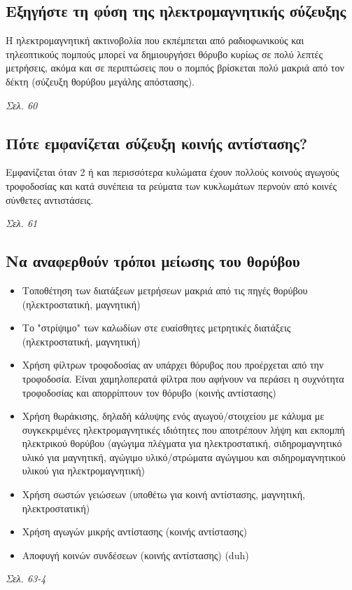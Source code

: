 \documentclass{article}
\begin{document}
\subsection{Εξηγήστε τη φύση της ηλεκτρομαγνητικής σύζευξης}
Η ηλεκτρομαγνητική ακτινοβολία που εκπέμπεται από ραδιοφωνικούς και τηλεοπτικούς πομπούς μπορεί να δημιουργήσει θόρυβο κυρίως σε πολύ λεπτές μετρήσεις, ακόμα και σε περιπτώσεις που ο πομπός βρίσκεται πολύ μακριά από τον δέκτη (σύζευξη θορύβου μεγάλης απόστασης).

\emph{Σελ. 60}

\subsection{Πότε εμφανίζεται σύζευξη κοινής αντίστασης?}
Εμφανίζεται όταν 2 ή και περισσότερα κυλώματα έχουν πολλούς κοινούς αγωγούς τροφοδοσίας και κατά συνέπεια τα ρεύματα των κυκλωμάτων περνούν από κοινές σύνθετες αντιστάσεις.

\emph{Σελ. 61}

\subsection{Να αναφερθούν τρόποι μείωσης του θορύβου}
\begin{itemize}
    \item Τοποθέτηση των διατάξεων μετρήσεων μακριά από τις πηγές θορύβου (ηλεκτροστατική, μαγνητική)
    \item Το "στρίψιμο" των καλωδίων στε ευαίσθητες μετρητικές διατάξεις (ηλεκτροστατική, μαγνητική)
    \item Χρήση φίλτρων τροφοδοσίας αν υπάρχει θόρυβος που προέρχεται από την τροφοδοσία. Είναι χαμηλοπερατά φίλτρα που αφήνουν να περάσει η συχνότητα τροφοδοσίας και απορρίπτουν τον θόρυβο (κοινής αντίστασης)
    \item Χρήση θωράκισης, δηλαδή κάλυψης ενός αγωγού/στοιχείου με κάλυμα με συγκεκριμένες ηλεκτρομαγνητικές ιδιότητες που αποτρέπουν λήψη και εκπομπή ηλεκτρικού θορύβου (αγώγιμα πλέγματα για ηλεκτροστατική, σιδηρομαγνητικό υλικό για μαγνητική, αγώγιμο υλικό/στρώματα αγώγιμου και σιδηρομαγνητικού υλικού για ηλεκτρομαγνητική)
    \item Χρήση σωστών γειώσεων (υποθέτω για κοινή αντίστασης, μαγνητική, ηλεκτροστατική)
    \item Χρήση αγωγών μικρής αντίστασης (κοινής αντίστασης)
    \item Αποφυγή κοινών συνδέσεων (κοινής αντίστασης) \foreignlanguage{english}{{(duh)}}
\end{itemize}
\emph{Σελ. 63-4}
\end{document}
